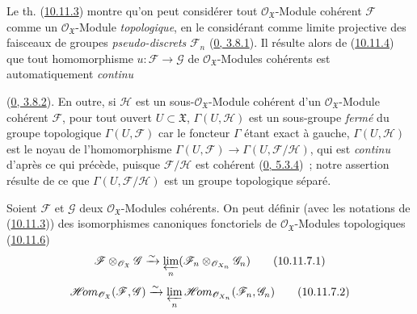 \begin{env}[10.11.6]
\label{I.10.11.6-fr}
Le th. (\hyperref[I.10.11.3-fr]{10.11.3}) montre qu'on peut considérer
tout $\mathscr{O}_{\mathfrak{X}}$-Module cohérent $\mathscr{F}$ comme
un $\mathscr{O}_{\mathfrak{X}}$-Module \emph{topologique}, en le
considérant comme limite projective des faisceaux de groupes
\emph{pseudo-discrets} $\mathscr{F}_n$
(\hyperref[0.3.8.1-fr]{0, 3.8.1}). Il résulte alors de
(\hyperref[I.10.11.4-fr]{10.11.4}) que tout homomorphisme
$u:\mathscr{F}\to\mathscr{G}$ de
$\mathscr{O}_{\mathfrak{X}}$-Modules cohérents est automatiquement
\emph{continu}


(\hyperref[0.3.8.2-fr]{0, 3.8.2}). En outre, si $\mathscr{H}$ est un
sous-$\mathscr{O}_{\mathfrak{X}}$-Module cohérent d'un
$\mathscr{O}_{\mathfrak{X}}$-Module cohérent $\mathscr{F}$, pour tout
ouvert $U\subset\mathfrak{X}$, $\Gamma(U,\mathscr{H})$ est un sous-groupe
\emph{fermé} du groupe topologique $\Gamma(U,\mathscr{F})$ car le foncteur
$\Gamma$ étant exact à gauche, $\Gamma(U,\mathscr{H})$ est le noyau de
l'homomorphisme
$\Gamma(U,\mathscr{F})\to\Gamma(U,\mathscr{F}/\mathscr{H})$, qui est
\emph{continu} d'après ce qui précède, puisque $\mathscr{F}/\mathscr{H}$
est cohérent (\hyperref[0.5.3.4-fr]{0, 5.3.4})~; notre assertion résulte
de ce que $\Gamma(U,\mathscr{F}/\mathscr{H})$ est un groupe topologique
séparé.
\end{env}

\begin{proposition}[10.11.7]
\label{I.10.11.7-fr}
Soient $\mathscr{F}$ et $\mathscr{G}$ deux
$\mathscr{O}_{\mathfrak{X}}$-Modules cohérents. On peut définir (avec les
notations de (\hyperref[I.10.11.3-fr]{10.11.3})) des isomorphismes
canoniques fonctoriels de $\mathscr{O}_{\mathfrak{X}}$-Modules
topologiques (\hyperref[I.10.11.6-fr]{10.11.6})
\[
  \label{I.10.11.7.1-fr}
  \mathscr{F}\otimes_{\mathscr{O}_{\mathfrak{X}}}\mathscr{G}
  \xrightarrow{\sim}
  \varprojlim_n
  (\mathscr{F}_n\otimes_{\mathscr{O}_{X_n}}\mathscr{G}_n)
  \tag{10.11.7.1}
\]
\[
  \label{I.10.11.7.2-fr}
  \mathscr{H}\!om_{\mathscr{O}_{\mathfrak{X}}}
  (\mathscr{F},\mathscr{G})
  \xrightarrow{\sim}
  \varprojlim_n
  \mathscr{H}\!om_{\mathscr{O}_{X_n}}(\mathscr{F}_n,\mathscr{G}_n)
  \tag{10.11.7.2}
\]
\end{proposition}

